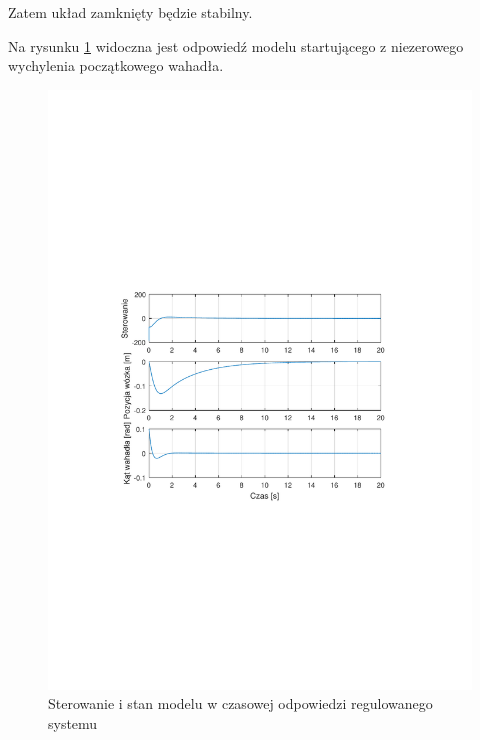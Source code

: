\documentclass[12pt]{article}
\begin{document}
Zatem układ zamknięty będzie stabilny.

\newpage

Na rysunku \ref{rys:lq_response_model} widoczna jest odpowiedź modelu
startującego z niezerowego wychylenia początkowego wahadła.

\begin{figure}[!htb]
    \begin{center}
        \includegraphics[width=16cm,trim=3cm 9cm 3cm 9cm,clip]
        {../res/img/lq_response_model.pdf}
    \end{center}
    \caption{Sterowanie i stan modelu w czasowej odpowiedzi regulowanego
    systemu}
    \label{rys:lq_response_model}
\end{figure}
\end{document}
